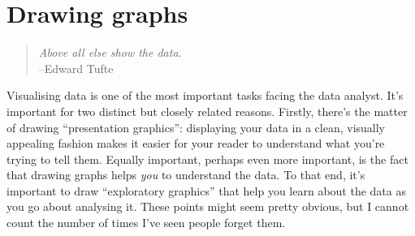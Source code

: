 

\chapter{Drawing graphs\label{ch:graphics}}

\begin{quote}
{\it Above all else show the data.}\\
\hspace*{2cm} --Edward Tufte
\end{quote}








\iffalse %
















\noindent
Visualising data is one of the most important tasks facing the data analyst. It's important for two distinct but closely related reasons. Firstly, there's the matter of drawing ``presentation graphics'': displaying your data in a clean, visually appealing fashion makes it easier for your reader to understand what you're trying to tell them. Equally important, perhaps even more important, is the fact that drawing graphs helps {\it you} to understand the data. To that end, it's important to draw ``exploratory graphics'' that help you learn about the data as you go about analysing it. These points might seem pretty obvious, but I cannot count the number of times I've seen people forget them. 

